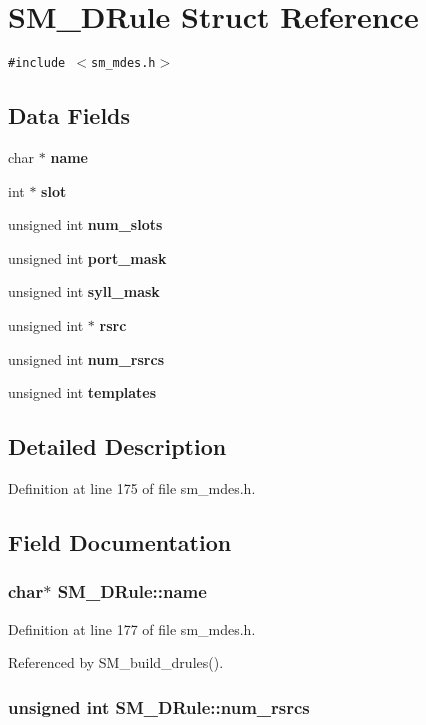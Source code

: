 \section{SM\_\-DRule Struct Reference}
\label{structSM__DRule}
{\tt \#include $<$sm\_\-mdes.h$>$}

\subsection*{Data Fields}
\begin{CompactItemize}
\item 
char $\ast$ \bf{name}
\item 
int $\ast$ \bf{slot}
\item 
unsigned int \bf{num\_\-slots}
\item 
unsigned int \bf{port\_\-mask}
\item 
unsigned int \bf{syll\_\-mask}
\item 
unsigned int $\ast$ \bf{rsrc}
\item 
unsigned int \bf{num\_\-rsrcs}
\item 
unsigned int \bf{templates}
\end{CompactItemize}


\subsection{Detailed Description}




Definition at line 175 of file sm\_\-mdes.h.

\subsection{Field Documentation}
\subsubsection{\setlength{\rightskip}{0pt plus 5cm}char$\ast$ \bf{SM\_\-DRule::name}}\label{structSM__DRule_c82ebfbdebf5a5531854fb68eed62ff6}




Definition at line 177 of file sm\_\-mdes.h.

Referenced by SM\_\-build\_\-drules().
\subsubsection{\setlength{\rightskip}{0pt plus 5cm}unsigned int \bf{SM\_\-DRule::num\_\-rsrcs}}\label{structSM__DRule_8f33c1eaf0654d7513e158f64f62c219}




